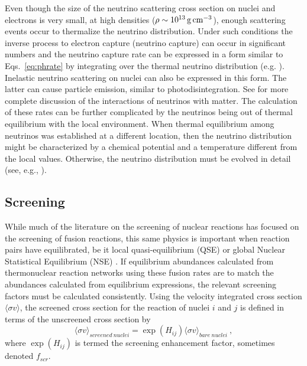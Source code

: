 \documentclass[12pt,modern,tighten,times,apj]{aastex61}
\newcommand{\eg}{e.g.}
\newcommand{\thsp}{\thinspace}
\newcommand{\gcc}{\ensuremath{\mathrm{\thsp g \thsp cm^{-3}}}}
\begin{document}
Even though the size of the neutrino scattering cross section on nuclei and electrons is very small, at high densities ($\rho \sim 10^{13} \gcc$), enough scattering events occur to thermalize the neutrino distribution.  Under such conditions the inverse process to electron capture (neutrino capture) can occur in significant numbers and the neutrino capture rate can be expressed in a form similar to Eqs.~\ref{eq:phrate} by integrating over the thermal 
neutrino distribution (e.g. \cite{FuMe95}).  Inelastic neutrino scattering 
on nuclei can also be expressed in this form.  The latter can cause 
particle emission, similar to photodisintegration.  See \cite{BuRe04,Brue85,Voge04} for more complete discussion of the interactions of neutrinos with matter.  The calculation of these rates 
can be further complicated by the neutrinos being out of thermal 
equilibrium with the local environment.  When thermal equilibrium among 
neutrinos was established at a different location, then the neutrino 
distribution might be characterized by a chemical potential and a 
temperature different from the local values.  Otherwise, the neutrino 
distribution must be evolved in detail (see, \eg, \cite{MeMe99}). 

\subsection{Screening}

While much of the literature on the screening of nuclear reactions has focused on the screening of fusion reactions, this same physics is important when reaction pairs have equilibrated, be it local quasi-equilibrium (QSE) or global Nuclear Statistical Equilibrium (NSE) \citep{HiTh96,BrGa99}.
If equilibrium abundances calculated from thermonuclear reaction networks using these fusion rates are to match the abundances calculated from equilibrium expressions, the relevant screening factors must be calculated consistently.
Using the velocity integrated cross section $\langle \sigma v \rangle$, the screened cross section for the reaction of nuclei $i$ and $j$ is defined in terms of the unscreened cross section by
\begin{equation}
{\langle \sigma v \rangle}_{screened\ nuclei} = \exp(H_{ij}) {\langle 
\sigma v \rangle}_{bare\ nuclei} \ ,
\end{equation}
where $\exp(H_{ij})$ is termed the screening enhancement factor, sometimes denoted $f_{scr}$.
 
\end{document}
